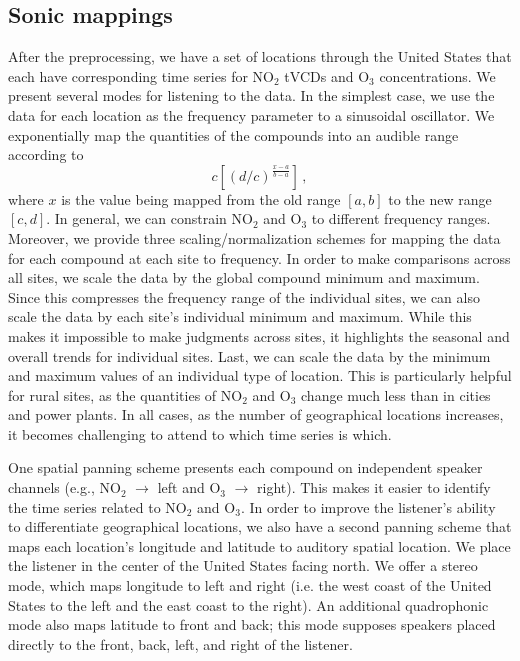 \documentclass[a4paper,10pt,oneside]{article}
\newcommand{\ce}[1]{$\mathrm{#1}$}
\begin{document}
\begin{sloppy}
\subsection{Sonic mappings}
\label{sec:sonic-mappings}
After the preprocessing, we have a set of locations through the United States that each have corresponding time series for \ce{NO_2} tVCDs and \ce{O_3} concentrations. We present several modes for listening to the data. In the simplest case, we use the data for each location as the frequency parameter to a sinusoidal oscillator.  We exponentially map the quantities of the compounds into an audible range according to
\begin{equation}
    c \left[(d/c)^{\frac{x-a}{b-a}}\right]\,,
\end{equation}
where $x$ is the value being mapped from the old range $[a, b]$ to the new range $[c, d]$.  In general, we can constrain \ce{NO_2} and \ce{O_3} to different frequency ranges.  Moreover, we provide three scaling/normalization schemes for mapping the data for each compound at each site to frequency. In order to make comparisons across all sites, we scale the data by the global compound minimum and maximum.  Since this compresses the frequency range of the individual sites, we can also scale the data by each site's individual minimum and maximum. While this makes it impossible to make judgments across sites, it highlights the seasonal and overall trends for individual sites. Last, we can scale the data by the minimum and maximum values of an individual type of location. This is particularly helpful for rural sites, as the quantities of \ce{NO_2} and \ce{O_3} change much less than in cities and power plants. In all cases, as the number of geographical locations increases, it becomes challenging to attend to which time series is which.  

One spatial panning scheme presents each compound on independent speaker channels (e.g., \ce{NO_2} $\rightarrow$ left and \ce{O_3} $\rightarrow$ right).  This  makes it easier to identify the time series related to \ce{NO_2} and \ce{O_3}.  In order to improve the listener's ability to differentiate geographical locations, we also have a second panning scheme that maps each location's longitude and latitude to auditory spatial location. We place the listener in the center of the United States facing north.  We offer a stereo mode, which maps longitude to left and right (i.e. the west coast of the United States to the left and the east coast to the right). An additional quadrophonic mode also maps latitude to front and back; this mode supposes speakers placed directly to the front, back, left, and right of the listener.


\end{sloppy}
\end{document}
